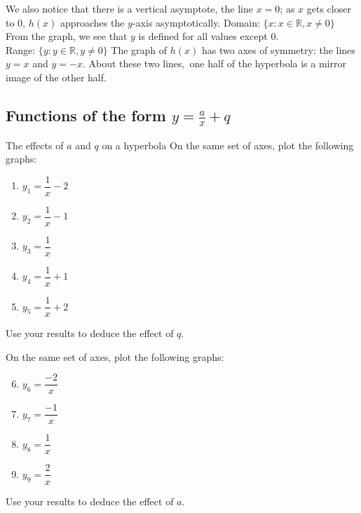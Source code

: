 \begin{wex}
{We also notice that there is a vertical asymptote, the line $x=0$; as $x$ gets closer to $0$, $h(x)$ approaches the $y$-axis asymptotically.
Domain: $\{x : x \in \mathbb{R}, x \ne 0\}$\\
From the graph, we see that $y$ is defined for all values except $0$.\\
Range: $\{y : y \in \mathbb{R}, y \ne 0\}$
The graph of $h(x)$ has two axes of symmetry: the lines $y=x$ and $y=-x$. About these two lines,\ one half of the hyperbola is a mirror image of the other half. 
}
\end{wex}




\subsection*{Functions of the form $y=\frac{a}{x}+q$}
\begin{Investigation}{The effects of $a$ and $q$ on a hyperbola}
  On the same set of axes, plot the following graphs:
  \begin{enumerate}[itemsep=3pt, label=\textbf{\arabic*}. ] 
  \item $y_1=\dfrac{1}{x}-2$
  \item $y_2=\dfrac{1}{x}-1$
  \item $y_3=\dfrac{1}{x}$
  \item $y_4=\dfrac{1}{x}+1$
  \item $y_5=\dfrac{1}{x}+2$
  \end{enumerate}
Use your results to deduce the effect of $q$.\\
\par
On the same set of axes, plot the following graphs:
\begin{enumerate}[itemsep=3pt, label=\textbf{\arabic*}. ] \setcounter{enumi}{5}
\item $y_6=\dfrac{-2}{x}$
\item $y_7=\dfrac{-1}{x}$
\item $y_8=\dfrac{1}{x}$
\item $y_9=\dfrac{2}{x}$
\end{enumerate}
\par
Use your results to deduce the effect of $a$.
\end{Investigation}

